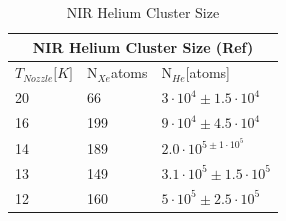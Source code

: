 \begin{table}
\centering
\begin{tabular}{|l|l|l|}
\hline
\multicolumn{3}{|c|}{NIR  Helium Cluster Size (Ref)}                            \\ \hline
$T_{Nozzle} {[}K{]}$  &  N$_{Xe}$atoms & N$_{He}$[atoms] \\ \hline
20                    & 66        & $3\cdot 10^{4} \pm 1.5 \cdot 10^{4}$                      \\ \hline
16                    & 199       & $9\cdot 10^{4}\pm 4.5\cdot 10^{4}$                      \\ \hline
14                    & 189       & $2.0\cdot 10^{5\pm 1\cdot 10^{5}}$                    \\ \hline
13                    & 149       & $3.1\cdot 10^{5}\pm 1.5\cdot 10^{5}$                    \\ \hline
12                    & 160       & $5\cdot 10^{5}\pm 2.5\cdot 10^{5}$                     \\ \hline
\end{tabular}
\caption[NIR  Helium Cluster Size]{NIR  Helium Cluster Size}
\label{tab:NIRclustersize}
\end{table}


